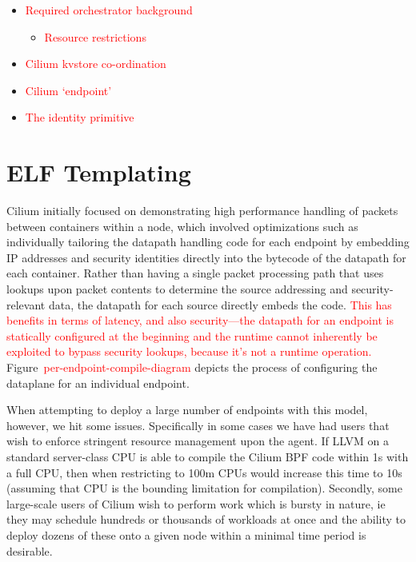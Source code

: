 \documentclass[10pt,sigconf,authorversion]{lpc}
\newcommand\todo[1]{\textcolor{red}{#1}}
\begin{document}
\begin{itemize}
    \item \todo{Required orchestrator background}
    \begin{itemize}
        \item \todo{Resource restrictions}
    \end{itemize}
    \item \todo{Cilium kvstore co-ordination}
    \item \todo{Cilium `endpoint'}
    \item \todo{The identity primitive}
\end{itemize}

\section{ELF Templating}

Cilium initially focused on demonstrating high performance handling of packets
between containers within a node, which involved optimizations such as
individually tailoring the datapath handling code for each endpoint by
embedding IP addresses and security identities directly into the bytecode of
the datapath for each container. Rather than having a single packet processing
path that uses lookups upon packet contents to determine the source addressing
and security-relevant data, the datapath for each source directly embeds the
code. \todo{This has benefits in terms of latency, and also security---the
datapath for an endpoint is statically configured at the beginning and the
runtime cannot inherently be exploited to bypass security lookups, because it's
not a runtime operation.} Figure~\todo{per-endpoint-compile-diagram} depicts
the process of configuring the dataplane for an individual endpoint.

When attempting to deploy a large number of endpoints with this model, however,
we hit some issues. Specifically in some cases we have had users that wish to
enforce stringent resource management upon the agent. If LLVM on a standard
server-class CPU is able to compile the Cilium BPF code within 1s with a full
CPU, then when restricting to 100m CPUs would increase this time to 10s
(assuming that CPU is the bounding limitation for compilation). Secondly, some
large-scale users of Cilium wish to perform work which is bursty in nature, ie
they may schedule hundreds or thousands of workloads at once and the ability to
deploy dozens of these onto a given node within a minimal time period is
desirable.
\end{document}
